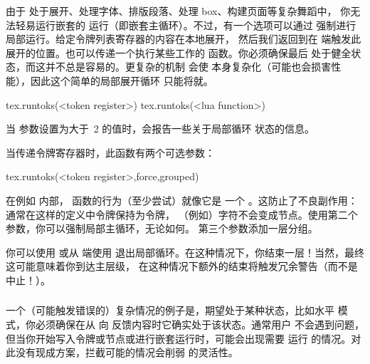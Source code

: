 由于 \TEX 处于展开、处理字体、排版段落、处理 box、构建页面等复杂舞蹈中，
你无法轻易运行嵌套的 \TEX 运行（即嵌套主循环）。不过，有一个选项可以通过
 强制进行局部运行。给定令牌列表寄存器的内容在本地展开，
然后我们返回到在 \LUA 端触发此展开的位置。也可以传递一个执行某些工作的
函数。你必须确保最后 \TEX 处于健全状态，而这并不总是容易的。更复杂的机制
会使 \TEX 本身复杂化（可能也会损害性能），因此这个简单的局部展开循环
只能将就。

\begin{typing}
tex.runtoks(<token register>)
tex.runtoks(<lua function>)
\end{typing}

当  参数设置为大于~2 的值时，会报告一些关于局部循环
状态的信息。

当传递令牌寄存器时，此函数有两个可选参数：

\begin{typing}
tex.runtoks(<token register>,force,grouped)
\end{typing}

在例如 \type {\edef} 内部， 函数的行为（至少尝试）就像它是
一个 \type {\the}。这防止了不良副作用：通常在这样的定义中令牌保持为令牌，
（例如）字符不会变成节点。使用第二个参数，你可以强制局部主循环，无论如何。
第三个参数添加一层分组。

你可以使用 \type {\endlocalcontrol} 或从 \LUA 端使用 
退出局部循环。在这种情况下，你结束一层！当然，最终这可能意味着你到达主层级，
在这种情况下额外的结束将触发冗余警告（而不是中止！）。

\subsubsection{}


一个（可能触发错误的）复杂情况的例子是，\TEX 期望处于某种状态，比如水平
模式，你必须确保在从 \LUA 向 \TEX 反馈内容时它确实处于该状态。通常用户
不会遇到问题，但当你开始写入令牌或节点或进行嵌套运行时，可能会出现需要
运行  的情况。对此没有现成方案，拦截可能的情况会削弱
\LUATEX 的灵活性。

\subsubsection{}



